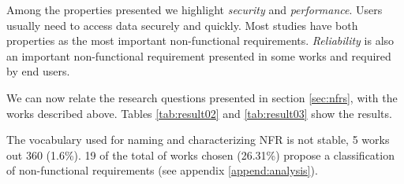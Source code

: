 
Among the properties presented we highlight \textit{security}
and \textit{performance}. Users usually need to access data
securely and quickly. Most studies have both properties as the most
important non-functional requirements. \textit{Reliability} is also an important
non-functional requirement presented in some works and required by end users.

We can now relate the research questions presented in section \ref{sec:nfrs},
with the works described above. Tables \ref{tab:result02} and \ref{tab:result03}
show the results.

The vocabulary used for naming and characterizing NFR is not stable, 5 works out
360 (1.6\%). 19 of the total of works chosen (26.31\%) propose a
classification of non-functional requirements (see appendix
\ref{append:analysis}).



